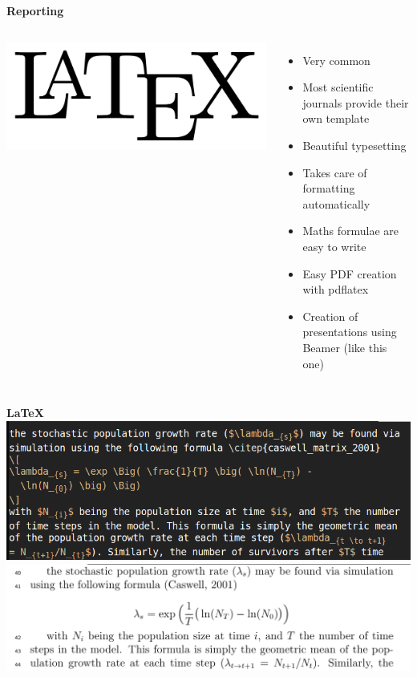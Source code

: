 \documentclass[9pt,xcolor=pdftex,dvipsnames,table]{beamer}
\begin{document}
\begin{frame}{\textbf{Reporting}}
\begin{columns}
\centering
\includegraphics[width=1\textwidth]{images/LaTeX-logo.png}
\begin{itemize}
\item Very common
\item Most scientific journals provide their own template
\item Beautiful typesetting
\item Takes care of formatting automatically
\item Maths formulae are easy to write
\item Easy PDF creation with pdflatex
\item Creation of presentations using Beamer (like this one)
\end{itemize}
\end{columns}
\end{frame}


\begin{frame}{\textbf{\LaTeX}}
\centering
\includegraphics[width=.8\textwidth]{images/latex-ex.png} \\
\vspace{.5cm}
\includegraphics[width=1\textwidth]{images/latex-ex-pdf.png}
\end{frame}
\end{document}
